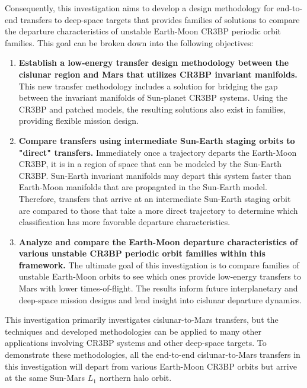 Consequently, this investigation aims to develop a design methodology for end-to-end transfers to deep-space targets that provides families of solutions to compare the departure characteristics
of unstable Earth-Moon CR3BP periodic orbit families. This goal can be broken down into the following objectives:
\begin{enumerate}
    \item   \textbf{Establish a low-energy transfer design methodology between the cislunar region and Mars that
            utilizes CR3BP invariant manifolds.} This new transfer methodology includes a
            solution for bridging the gap between the invariant manifolds of Sun-planet CR3BP
            systems. Using the CR3BP and patched models, the resulting solutions also exist in
            families, providing flexible mission design.
    \item   \textbf{Compare transfers using intermediate Sun-Earth staging orbits to "direct" transfers.}
            Immediately once a trajectory departs the Earth-Moon CR3BP, it is in a region of
            space that can be modeled by the Sun-Earth CR3BP. Sun-Earth invariant manifolds may
            depart this system faster than Earth-Moon manifolds that are propagated in the Sun-Earth
            model. Therefore, transfers that arrive at an intermediate Sun-Earth staging orbit are compared
            to those that take a more direct trajectory to determine which classification has more favorable departure characteristics.
    \item   \textbf{Analyze and compare the Earth-Moon departure characteristics of various
            unstable CR3BP periodic orbit families within this framework.} The ultimate goal of
            this investigation is to compare families of unstable Earth-Moon orbits to see which
            ones provide low-energy transfers to Mars with lower times-of-flight. The results inform
            future interplanetary and deep-space mission designs and lend insight into cislunar
            departure dynamics.

\end{enumerate}
This investigation primarily investigates cislunar-to-Mars transfers, but the techniques and developed
methodologies can be applied to many other applications involving CR3BP systems and other deep-space
targets. To demonstrate these methodologies, all the end-to-end cislunar-to-Mars transfers in this investigation will depart
from various Earth-Moon CR3BP orbits but arrive at the same Sun-Mars $L_{1}$ northern halo orbit.

